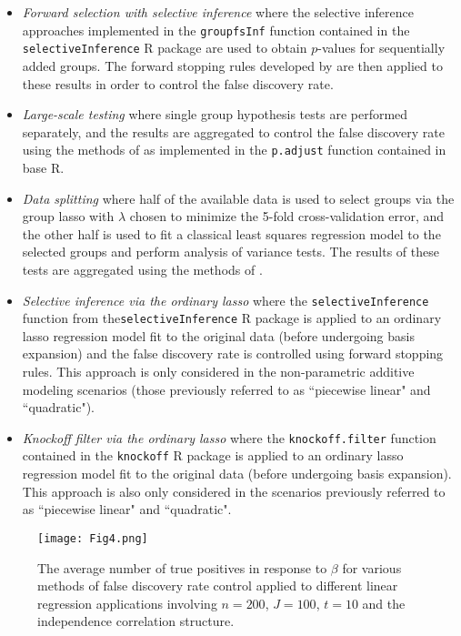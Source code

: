 \begin{itemize}[leftmargin=*, labelindent=0.5cm]
\item \textit{Forward selection with selective inference} where the selective inference approaches implemented in the {\tt groupfsInf} function contained in the {\tt selectiveInference} R package \citep{Selective_Inference} are used to obtain $p$-values for sequentially added groups.  The forward stopping rules developed by \citet{GSell2016} are then applied to these results in order to control the false discovery rate. 
\item \textit{Large-scale testing} where single group hypothesis tests are performed separately, and the results are aggregated to control the false discovery rate using the methods of \citet{BH_1995} as implemented in the {\tt p.adjust} function contained in base R.
\item \textit{Data splitting} where half of the available data is used to select groups via the group lasso with $\lambda$ chosen to minimize the 5-fold cross-validation error, and the other half is used to fit a classical least squares regression model to the selected groups and perform analysis of variance tests. The results of these tests are aggregated using the methods of \citet{BH_1995}.
\item \textit{Selective inference via the ordinary lasso} where the {\tt selectiveInference} function from the{\tt selectiveInference} R package is applied to an ordinary lasso regression model fit to the original data (before undergoing basis expansion) and the false discovery rate is controlled using forward stopping rules. This approach is only considered in the non-parametric additive modeling scenarios (those previously referred to as ``piecewise linear" and ``quadratic").
\item \textit{Knockoff filter via the ordinary lasso} where the {\tt knockoff.filter} function contained in the {\tt knockoff} R package \citep{barber2015} is applied to an ordinary lasso regression model fit to the original data (before undergoing basis expansion). This approach is also only considered in the scenarios previously referred to as ``piecewise linear" and ``quadratic".
\end{itemize}

\begin{figure} [!htb]
\centering
\texttt{[image: Fig4.png]}
\caption{\label{Fig:power} The average number of true positives in response to $\beta$ for various methods of false discovery rate control applied to different linear regression applications involving $n =200$, $J = 100$, $t = 10$ and the independence correlation structure.}
\end{figure}

